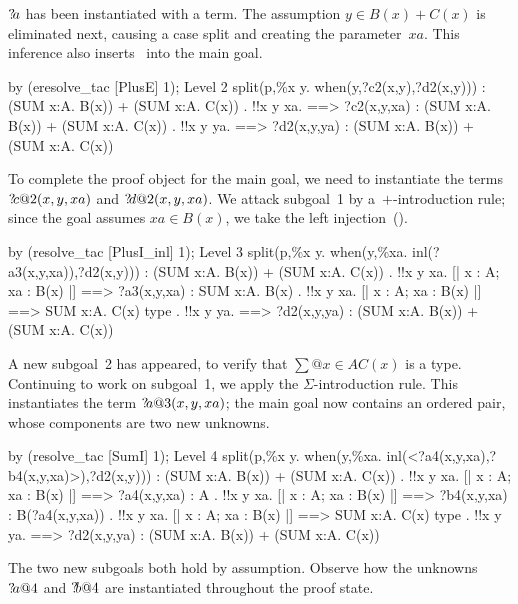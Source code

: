 ${?\!a}$ has been instantiated with a  term.  The
assumption $y\in B(x) + C(x)$ is eliminated next, causing a case split and
creating the parameter~$xa$.  This inference also inserts~
into the main goal.
\begin{ttbox}
by (eresolve_tac [PlusE] 1);
{\out Level 2}
{\out split(p,\%x y. when(y,?c2(x,y),?d2(x,y)))}
{\out : (SUM x:A. B(x)) + (SUM x:A. C(x))}
{. !!x y xa.}
{\out        [| x : A; xa : B(x) |] ==>}
{\out        ?c2(x,y,xa) : (SUM x:A. B(x)) + (SUM x:A. C(x))}
\ttbreak
{. !!x y ya.}
{\out        [| x : A; ya : C(x) |] ==>}
{\out        ?d2(x,y,ya) : (SUM x:A. B(x)) + (SUM x:A. C(x))}
\end{ttbox}
To complete the proof object for the main goal, we need to instantiate the
terms ${?\!c@2}(x,y,xa)$ and ${?\!d@2}(x,y,xa)$.  We attack subgoal~1 by
a~$+$-introduction rule; since the goal assumes $xa\in B(x)$, we take the left
injection~().
\begin{ttbox}
by (resolve_tac [PlusI_inl] 1);
{\out Level 3}
{\out split(p,\%x y. when(y,\%xa. inl(?a3(x,y,xa)),?d2(x,y)))}
{\out : (SUM x:A. B(x)) + (SUM x:A. C(x))}
{. !!x y xa. [| x : A; xa : B(x) |] ==> ?a3(x,y,xa) : SUM x:A. B(x)}
{. !!x y xa. [| x : A; xa : B(x) |] ==> SUM x:A. C(x) type}
\ttbreak
{. !!x y ya.}
{\out        [| x : A; ya : C(x) |] ==>}
{\out        ?d2(x,y,ya) : (SUM x:A. B(x)) + (SUM x:A. C(x))}
\end{ttbox}
A new subgoal~2 has appeared, to verify that $\sum@{x\in A}C(x)$ is a type.
Continuing to work on subgoal~1, we apply the $\Sigma$-introduction rule.
This instantiates the term ${?\!a@3}(x,y,xa)$; the main goal now contains
an ordered pair, whose components are two new unknowns.%
\begin{ttbox}
by (resolve_tac [SumI] 1);
{\out Level 4}
{\out split(p,\%x y. when(y,\%xa. inl(<?a4(x,y,xa),?b4(x,y,xa)>),?d2(x,y)))}
{\out : (SUM x:A. B(x)) + (SUM x:A. C(x))}
{. !!x y xa. [| x : A; xa : B(x) |] ==> ?a4(x,y,xa) : A}
{. !!x y xa. [| x : A; xa : B(x) |] ==> ?b4(x,y,xa) : B(?a4(x,y,xa))}
{. !!x y xa. [| x : A; xa : B(x) |] ==> SUM x:A. C(x) type}
{. !!x y ya.}
{\out        [| x : A; ya : C(x) |] ==>}
{\out        ?d2(x,y,ya) : (SUM x:A. B(x)) + (SUM x:A. C(x))}
\end{ttbox}
The two new subgoals both hold by assumption.  Observe how the unknowns
${?\!a@4}$ and ${?\!b@4}$ are instantiated throughout the proof state.
